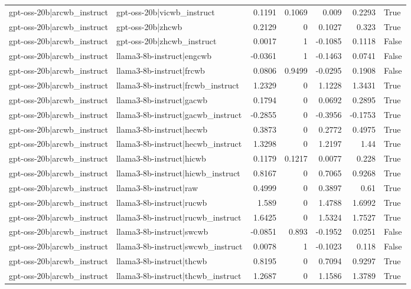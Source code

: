 \begin{table}
\begin{tabular}{l l r r r r l}
gpt-oss-20b|arcwb_instruct & gpt-oss-20b|vicwb_instruct & 0.1191 & 0.1069 & 0.009 & 0.2293 & True \\
gpt-oss-20b|arcwb_instruct & gpt-oss-20b|zhcwb & 0.2129 & 0 & 0.1027 & 0.323 & True \\
gpt-oss-20b|arcwb_instruct & gpt-oss-20b|zhcwb_instruct & 0.0017 & 1 & -0.1085 & 0.1118 & False \\
gpt-oss-20b|arcwb_instruct & llama3-8b-instruct|engcwb & -0.0361 & 1 & -0.1463 & 0.0741 & False \\
gpt-oss-20b|arcwb_instruct & llama3-8b-instruct|frcwb & 0.0806 & 0.9499 & -0.0295 & 0.1908 & False \\
gpt-oss-20b|arcwb_instruct & llama3-8b-instruct|frcwb_instruct & 1.2329 & 0 & 1.1228 & 1.3431 & True \\
gpt-oss-20b|arcwb_instruct & llama3-8b-instruct|gacwb & 0.1794 & 0 & 0.0692 & 0.2895 & True \\
gpt-oss-20b|arcwb_instruct & llama3-8b-instruct|gacwb_instruct & -0.2855 & 0 & -0.3956 & -0.1753 & True \\
gpt-oss-20b|arcwb_instruct & llama3-8b-instruct|hecwb & 0.3873 & 0 & 0.2772 & 0.4975 & True \\
gpt-oss-20b|arcwb_instruct & llama3-8b-instruct|hecwb_instruct & 1.3298 & 0 & 1.2197 & 1.44 & True \\
gpt-oss-20b|arcwb_instruct & llama3-8b-instruct|hicwb & 0.1179 & 0.1217 & 0.0077 & 0.228 & True \\
gpt-oss-20b|arcwb_instruct & llama3-8b-instruct|hicwb_instruct & 0.8167 & 0 & 0.7065 & 0.9268 & True \\
gpt-oss-20b|arcwb_instruct & llama3-8b-instruct|raw & 0.4999 & 0 & 0.3897 & 0.61 & True \\
gpt-oss-20b|arcwb_instruct & llama3-8b-instruct|rucwb & 1.589 & 0 & 1.4788 & 1.6992 & True \\
gpt-oss-20b|arcwb_instruct & llama3-8b-instruct|rucwb_instruct & 1.6425 & 0 & 1.5324 & 1.7527 & True \\
gpt-oss-20b|arcwb_instruct & llama3-8b-instruct|swcwb & -0.0851 & 0.893 & -0.1952 & 0.0251 & False \\
gpt-oss-20b|arcwb_instruct & llama3-8b-instruct|swcwb_instruct & 0.0078 & 1 & -0.1023 & 0.118 & False \\
gpt-oss-20b|arcwb_instruct & llama3-8b-instruct|thcwb & 0.8195 & 0 & 0.7094 & 0.9297 & True \\
gpt-oss-20b|arcwb_instruct & llama3-8b-instruct|thcwb_instruct & 1.2687 & 0 & 1.1586 & 1.3789 & True \\

\end{tabular}
\end{table}
